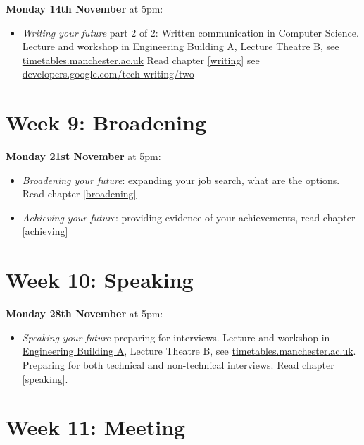 \documentclass[
]{book}
\providecommand{\tightlist}{%
  \setlength{\itemsep}{0pt}\setlength{\parskip}{0pt}}
\begin{document}
\textbf{Monday 14th November} at 5pm:

\begin{itemize}
\tightlist
\item
  \emph{Writing your future} part 2 of 2: Written communication in Computer Science. Lecture and workshop in \href{https://www.manchester.ac.uk/discover/maps/interactive-map/?id=540}{Engineering Building A}, Lecture Theatre B, see \href{https://timetables.manchester.ac.uk/}{timetables.manchester.ac.uk} Read chapter \ref{writing} see \href{https://developers.google.com/tech-writing/two}{developers.google.com/tech-writing/two}
\end{itemize}

\hypertarget{week9}{%
\section{Week 9: Broadening}\label{week9}}

\textbf{Monday 21st November} at 5pm:

\begin{itemize}
\tightlist
\item
  \emph{Broadening your future}: expanding your job search, what are the options. Read chapter \ref{broadening}
\item
  \emph{Achieving your future}: providing evidence of your achievements, read chapter \ref{achieving}
\end{itemize}

\hypertarget{week10}{%
\section{Week 10: Speaking}\label{week10}}

\textbf{Monday 28th November} at 5pm:

\begin{itemize}
\tightlist
\item
  \emph{Speaking your future} preparing for interviews. Lecture and workshop in \href{https://www.manchester.ac.uk/discover/maps/interactive-map/?id=540}{Engineering Building A}, Lecture Theatre B, see \href{https://timetables.manchester.ac.uk/}{timetables.manchester.ac.uk}. Preparing for both technical and non-technical interviews. Read chapter \ref{speaking}.
\end{itemize}

\hypertarget{week11}{%
\section{Week 11: Meeting}\label{week11}}
\end{document}
